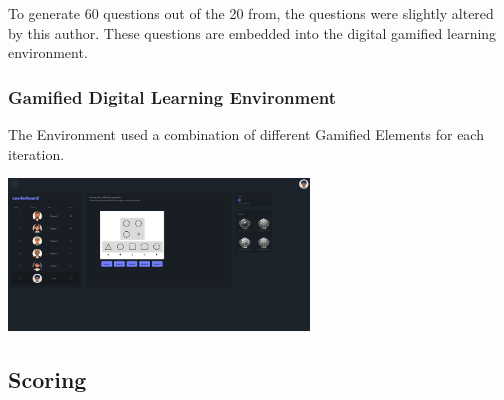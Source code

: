 To generate 60 questions out of the 20 from\textcite{albuquerqueDoesGenderStereotype2017}, the questions were slightly altered by this author.
These questions are embedded into the digital gamified learning environment.
\subsubsection{Gamified Digital Learning Environment}
The Environment used a combination of different Gamified Elements for each iteration.
\begin{minipage}{\textwidth}
    \includegraphics[width=0.6\textwidth]{img/question_screen.png}
    \label{fig:figureScreen}
  \end{minipage}
  
\subsection{Scoring}